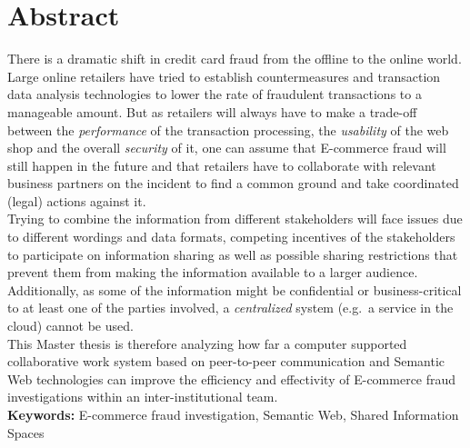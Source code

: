 
\chapter*{Abstract}

There is a dramatic shift in credit card fraud from the offline to the online world. Large online retailers have tried to establish countermeasures and transaction data analysis technologies to lower the rate of fraudulent transactions to a manageable amount. But as retailers will always have to make a trade-off between the \emph{performance} of the transaction processing, the \emph{usability} of the web shop and the overall \emph{security} of it, one can assume that \gls{E-commerce} fraud will still happen in the future and that retailers have to collaborate with relevant business partners on the incident to find a common ground and take coordinated (legal) actions against it. \\

Trying to combine the information from different stakeholders will face issues due to different wordings and data formats, competing incentives of the stakeholders to participate on information sharing as well as possible sharing restrictions that prevent them from making the information available to a larger audience. Additionally, as some of the information might be confidential or business-critical to at least one of the parties involved, a \emph{centralized} system (e.g.\ a service in the cloud) cannot be used. \\

This Master thesis is therefore analyzing how far a computer supported collaborative work system based on peer-to-peer communication and Semantic Web technologies can improve the efficiency and effectivity of \gls{E-commerce} fraud investigations within an inter-institutional team. \\[2em]

\textbf{Keywords:} \gls{E-commerce} fraud investigation, Semantic Web, Shared Information Spaces
